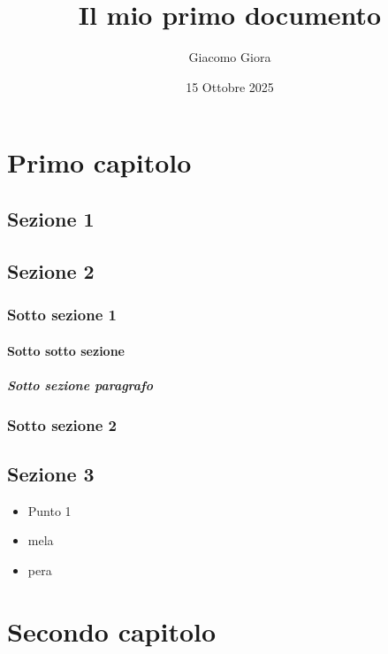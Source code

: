 \documentclass{report} %
\title{Il mio primo documento} %
\author{Giacomo Giora} %
\date{15 Ottobre 2025}
\begin{document}

\maketitle %
\tableofcontents %

\chapter{Primo capitolo} %
\section{Sezione 1} %
\section{Sezione 2}
\subsection{Sotto sezione 1} %
\subsubsection{Sotto sotto sezione} %
\paragraph{Sotto sezione paragrafo} %
\subsection{Sotto sezione 2}

\section{Sezione 3}
\begin{itemize} %
    \item Punto 1 %
    \item mela
    \item pera
\end{itemize}

\chapter{Secondo capitolo}

\end{document}

